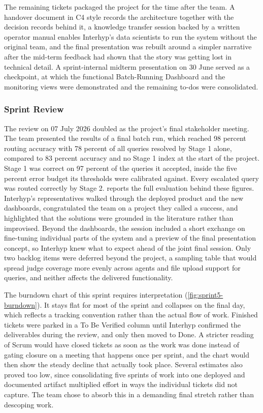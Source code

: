 The remaining tickets packaged the project for the time after the team. A handover document in C4 style records the architecture together with the decision records behind it, a knowledge transfer session backed by a written operator manual enables Interhyp's data scientists to run the system without the original team, and the final presentation was rebuilt around a simpler narrative after the mid-term feedback had shown that the story was getting lost in technical detail. A sprint-internal midterm presentation on 30 June served as a checkpoint, at which the functional Batch-Running Dashboard and the monitoring views were demonstrated and the remaining to-dos were consolidated.

\subsubsection{Sprint Review}\label{sec:sprint5-review}

The review on 07 July 2026 doubled as the project's final stakeholder meeting. The team presented the results of a final batch run, which reached 98 percent routing accuracy with 78 percent of all queries resolved by Stage 1 alone, compared to 83 percent accuracy and no Stage 1 index at the start of the project. Stage 1 was correct on 97 percent of the queries it accepted, inside the five percent error budget its thresholds were calibrated against. Every escalated query was routed correctly by Stage 2.  reports the full evaluation behind these figures. Interhyp's representatives walked through the deployed product and the new dashboards, congratulated the team on a project they called a success, and highlighted that the solutions were grounded in the literature rather than improvised. Beyond the dashboards, the session included a short exchange on fine-tuning individual parts of the system and a preview of the final presentation concept, so Interhyp knew what to expect ahead of the joint final session. Only two backlog items were deferred beyond the project, a sampling table that would spread judge coverage more evenly across agents and file upload support for queries, and neither affects the delivered functionality.

The burndown chart of this sprint requires interpretation (\cref{fig:sprint5-burndown}). It stays flat for most of the sprint and collapses on the final day, which reflects a tracking convention rather than the actual flow of work. Finished tickets were parked in a To Be Verified column until Interhyp confirmed the deliverables during the review, and only then moved to Done. A stricter reading of Scrum would have closed tickets as soon as the work was done instead of gating closure on a meeting that happens once per sprint, and the chart would then show the steady decline that actually took place. Several estimates also proved too low, since consolidating five sprints of work into one deployed and documented artifact multiplied effort in ways the individual tickets did not capture. The team chose to absorb this in a demanding final stretch rather than descoping work.

